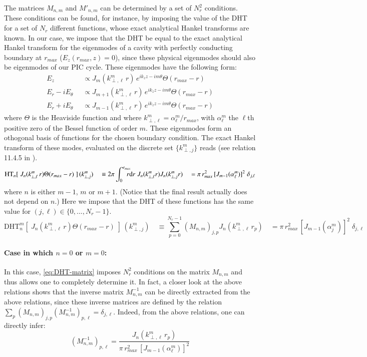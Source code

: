 The matrices $M_{n,m}$ and $M'_{n,m}$ can be determined by a set of $N_r^2$ conditions. These
conditions can be found, for instance, by imposing the value of the
DHT for a set of $N_r$ different functions, whose exact analytical Hankel
transforms are known. In our case, we impose that the DHT be equal to the exact analytical
Hankel transform for the eigenmodes of a cavity with
perfectly conducting boundary at $r_{max}$ ($E_z(r_{max},z) =
0$), since these physical eigenmodes should also be eigenmodes of our
PIC cycle. These eigenmodes have the following form:
\begin{align*}
E_z \;& \; \propto  J_m(k^m_{\perp,\ell} \,r)\,e^{ik_z z -im\theta} \Theta(r_{max}-r) \\
E_r -i E_\theta \;& \; \propto  J_{m+1}(k^m_{\perp,\ell} \,r) \,e^{ik_z z -im\theta} \Theta(r_{max}-r)\\
E_r +i E_\theta \;& \; \propto  J_{m-1}(k^m_{\perp,\ell} \,r)
                    \,e^{ik_z z -im\theta} \Theta(r_{max}-r) 
\end{align*}
where $\Theta$ is the Heaviside function and where $k^m_{\perp,\ell} =
\alpha^m_\ell / r_{max}$, with $\alpha^m_\ell$ the $\ell$th positive zero of
the Bessel function of order $m$. These eigenmodes form an othogonal basis of
functions for the chosen boundary condition. The exact Hankel
transform of these modes, evaluated on the discrete set
$\{k^m_{\perp,j} \}$ reads (see relation 11.4.5 in \cite{Abramowitz}).
\[ \mathrm{HT}_{n}[ \; J_n(k^m_{\perp,\ell} \,r)  \Theta(r_{max}-r)  \;] \,(k^m_{\perp,j} )
\quad \equiv 2\pi \int_{0}^{r_{max}} \!\!\!\!\! r\mathrm{d}r \; J_n (k^m_{\perp,\ell} r) J_n (k^m_{\perp,j} r)
\quad = \pi\, r_{max}^2\,[ J_{m-1}(\alpha_\ell^m)]^2 \; \delta_{j,\ell} \]
where $n$ is either $m-1$, $m$ or $m+1$. (Notice that the final
result actually does not depend on $n$.) Here we impose that the DHT of these functions has the same value for $(j,\ell) \in \{ 0,..., N_r - 1\}$.
\begin{equation}
\label{eq:DHT-matrix}
\mathrm{DHT}^m_{n}[ \; J_n(k^m_{\perp,\ell} \,r) \Theta(r_{max}-r)  \;] \,(k^m_{\perp,j}) 
\quad \equiv \sum_{p=0}^{N_r-1} (M_{n,m})_{j,p}
  J_n(k^m_{\perp,\ell}\,r_p) 
\quad = \pi\, r_{max}^2\,[ J_{m-1}(\alpha_j^m)]^2 \; \delta_{j,\ell} 
\end{equation}

\paragraph{Case in which $n=0$ or $m=0$:}
In this case, \cref{eq:DHT-matrix} imposes $N_r^2$ conditions on the matrix
$M_{n,m}$ and thus allows one to completely determine it. 
In fact, a closer look at the above relations shows
that the inverse matrix $M^{-1}_{n,m}$ can be directly extracted from the above relations,
since these inverse matrices are defined by the relation $\sum_p (M_{n,m})_{j,p}
(M^{-1}_{n,m})_{p,\ell} = \delta_{j,\ell}$. Indeed, from the above
relations, one can directly infer:
\[ (M_{n,m}^{-1})_{p,\ell} = \frac{ J_n(k^m_{\perp,\ell}\,r_p) } { \pi\,
  r_{max}^2\,[ J_{m-1}(\alpha_\ell^m)]^2  } \]


